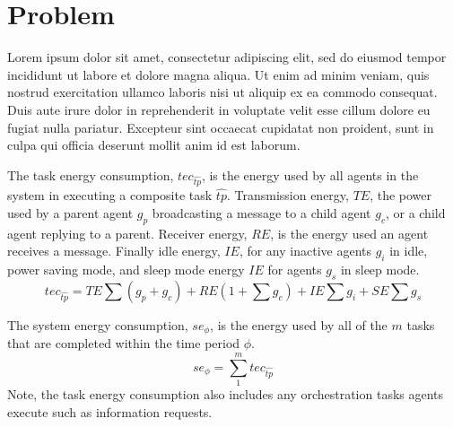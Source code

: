 \section{Problem}
\label{section:problem}
    Lorem ipsum dolor sit amet, consectetur adipiscing elit, sed do eiusmod tempor incididunt ut labore et dolore magna aliqua. Ut enim ad minim veniam, quis nostrud exercitation ullamco laboris nisi ut aliquip ex ea commodo consequat. Duis aute irure dolor in reprehenderit in voluptate velit esse cillum dolore eu fugiat nulla pariatur. Excepteur sint occaecat cupidatat non proident, sunt in culpa qui officia deserunt mollit anim id est laborum.
    
\newcommand{\varTime}[2]{\phi}
\newcommand{\varAtomicTask}[2]{tp}
\newcommand{\varCompositeTask}[2]{\hat{tp}}
\newcommand{\varAgent}[2]{g_{#1}^{#2}}
\newcommand{\varIdleAgent}[2]{\varAgent{i}{}}  
\newcommand{\varSleepAgent}[2]{\varAgent{s}{}}  
\newcommand{\varChildAgent}[2]{\varAgent{c}{}}    
\newcommand{\varParentAgent}[2]{\varAgent{p}{}}

\newcommand{\varOrchestrationEnergy}[2]{OE}
\newcommand{\varTransmissionEnergy}[2]{TE}
\newcommand{\varReceiverEnergy}[2]{RE}
\newcommand{\varIdleEnergy}[2]{IE}
\newcommand{\varSleepEnergy}[2]{SE}
\newcommand{\varSystemEnergy}[2]{se_{\varTime{}{}}}
\newcommand{\varTaskEnergy}[2]{tec_{\varCompositeTask{}{}}}  

\begin{definition}
	The task energy consumption, $\varTaskEnergy{}{}$, is the energy used by all agents in the system in executing a composite task $\varCompositeTask{}{}$. Transmission energy, $\varTransmissionEnergy{}{}$, the power used by a parent agent $\varParentAgent{}{}$ broadcasting a message to a child agent $\varChildAgent{}{}$, or a child agent replying to a parent. Receiver energy, $\varReceiverEnergy{}{}$, is the energy used an agent receives a message. Finally idle energy, $\varIdleEnergy{}{}$, for any inactive agents $\varIdleAgent{}{}$ in idle, power saving mode, and sleep mode energy $\varIdleEnergy{}{}$ for agents $\varSleepAgent{}{}$ in sleep mode.
   	\begin{equation}
   		\varTaskEnergy{}{} 
   		= \varTransmissionEnergy{}{} \sum (\varParentAgent{}{} + \varChildAgent{}{})
   		+ \varReceiverEnergy{}{} (1 + \sum \varChildAgent{}{})
   		+ \varIdleEnergy{}{} \sum \varIdleAgent{}{}
   		+ \varSleepEnergy{}{} \sum \varSleepAgent{}{}
   	\end{equation}
\end{definition}
\begin{definition}
	The system energy consumption, $\varSystemEnergy{}{}$, is the energy used by all of the $m$ tasks that are completed within the time period $\varTime{}{}$.
	\begin{equation}
		\varSystemEnergy{}{} 
		= \sum_{1}^{m} \varTaskEnergy{}{}
	\end{equation}
	Note, the task energy consumption also includes any orchestration tasks agents execute such as information requests.
\end{definition}